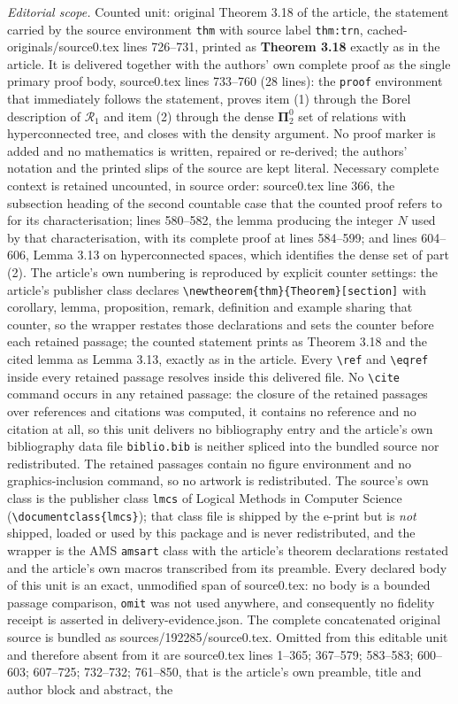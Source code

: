 \documentclass[10pt,a4paper]{amsart}
\newcommand{\bpi}{\boldsymbol\Pi}
\begin{document}
\noindent\textit{Editorial scope.} Counted unit: original Theorem 3.18 of the article, the statement carried by the source environment \texttt{thm} with source label \texttt{thm:trn}, cached-originals/source0.tex lines 726--731, printed as \textbf{Theorem 3.18} exactly as in the article. It is delivered together with the authors' own complete proof as the single primary proof body, source0.tex lines 733--760 (28 lines): the \texttt{proof} environment that immediately follows the statement, proves item (1) through the Borel description of $\mathcal R_1$ and item (2) through the dense $\bpi^0_2$ set of relations with hyperconnected tree, and closes with the density argument. No proof marker is added and no mathematics is written, repaired or re-derived; the authors' notation and the printed slips of the source are kept literal. Necessary complete context is retained uncounted, in source order: source0.tex line 366, the subsection heading of the second countable case that the counted proof refers to for its characterisation; lines 580--582, the lemma producing the integer $N$ used by that characterisation, with its complete proof at lines 584--599; and lines 604--606, Lemma 3.13 on hyperconnected spaces, which identifies the dense set of part (2). The article's own numbering is reproduced by explicit counter settings: the article's publisher class declares \texttt{\textbackslash newtheorem\{thm\}\{Theorem\}[section]} with corollary, lemma, proposition, remark, definition and example sharing that counter, so the wrapper restates those declarations and sets the counter before each retained passage; the counted statement prints as Theorem 3.18 and the cited lemma as Lemma 3.13, exactly as in the article. Every \texttt{\textbackslash ref} and \texttt{\textbackslash eqref} inside every retained passage resolves inside this delivered file. No \texttt{\textbackslash cite} command occurs in any retained passage: the closure of the retained passages over references and citations was computed, it contains no reference and no citation at all, so this unit delivers no bibliography entry and the article's own bibliography data file \texttt{biblio.bib} is neither spliced into the bundled source nor redistributed. The retained passages contain no figure environment and no graphics-inclusion command, so no artwork is redistributed. The source's own class is the publisher class \texttt{lmcs} of Logical Methods in Computer Science (\texttt{\textbackslash documentclass\{lmcs\}}); that class file is shipped by the e-print but is \emph{not} shipped, loaded or used by this package and is never redistributed, and the wrapper is the AMS \texttt{amsart} class with the article's theorem declarations restated and the article's own macros transcribed from its preamble. Every declared body of this unit is an exact, unmodified span of source0.tex: no body is a bounded passage comparison, \texttt{omit} was not used anywhere, and consequently no fidelity receipt is asserted in delivery-evidence.json. The complete concatenated original source is bundled as sources/192285/source0.tex. Omitted from this editable unit and therefore absent from it are source0.tex lines 1--365; 367--579; 583--583; 600--603; 607--725; 732--732; 761--850, that is the article's own preamble, title and author block and abstract, the 
\end{document}

